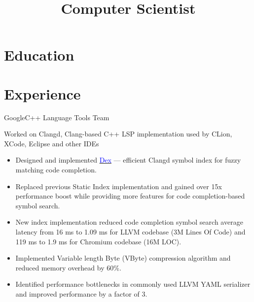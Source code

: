 \documentclass[10pt,a4paper,sans]{moderncv}
\title{Computer Scientist}
\begin{document}
\makecvtitle

\section{Education}

\section{Experience}
    {Google}{}{C++ Language Tools Team}
    {Worked on Clangd, Clang-based C++ LSP implementation used by CLion, XCode,
     Eclipse and other IDEs
     \begin{itemize}
       \item Designed and implemented
         \href{https://docs.google.com/document/d/1C-A6PGT6TynyaX4PXyExNMiGmJ2jL1UwV91Kyx11gOI/edit?usp=sharing}
         {\textcolor{blue}{Dex}} --- efficient Clangd symbol index for fuzzy
         matching code completion.
       \item Replaced previous Static Index implementation and gained over
         15x performance boost while providing more features for code
         completion-based symbol search.
       \item New index implementation reduced code completion symbol search
         average latency from 16 ms to 1.09 ms for LLVM codebase (3M Lines Of
         Code) and 119 ms to 1.9 ms for Chromium codebase (16M LOC).
       \item Implemented Variable length Byte (VByte) compression algorithm and
         reduced memory overhead by 60\%.
       \item Identified performance bottlenecks in commonly used LLVM YAML
         serializer and improved performance by a factor of 3.
     \end{itemize}}
\end{document}
